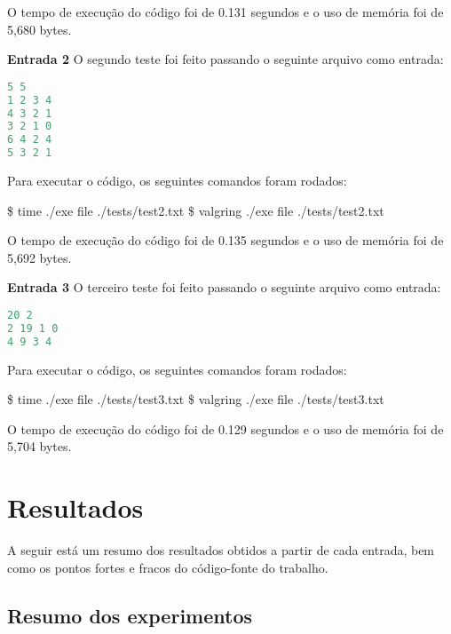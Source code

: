 \documentclass{article}
\begin{document}
O tempo de execução do código foi de 0.131 segundos e o uso de memória foi de 5,680	bytes.

\hfill\break

\noindent \textbf{Entrada 2}
O segundo teste foi feito passando o seguinte arquivo como entrada:

 \begin{lstlisting}[caption={Arquivo de entrada 2.},label={lst:cod7},language=C]
5 5
1 2 3 4
4 3 2 1
3 2 1 0
6 4 2 4
5 3 2 1
 \end{lstlisting}
 
 Para executar o código, os seguintes comandos foram rodados:
\begin{tcolorbox}[title=Comando da entrada 2 do modo file,width=\linewidth]
   	\$ time ./exe file ./tests/test2.txt
    \$ valgring ./exe file ./tests/test2.txt
\end{tcolorbox}

O tempo de execução do código foi de 0.135 segundos e o uso de memória foi de 5,692	bytes.

\hfill\break

\noindent \textbf{Entrada 3}
O terceiro teste foi feito passando o seguinte arquivo como entrada:

 \begin{lstlisting}[caption={Arquivo de entrada 3.},label={lst:cod8},language=C]
20 2
2 19 1 0
4 9 3 4
 \end{lstlisting}
 
 Para executar o código, os seguintes comandos foram rodados:
\begin{tcolorbox}[title=Comando da entrada 3 do modo file,width=\linewidth]
   	\$ time ./exe file ./tests/test3.txt
    \$ valgring ./exe file ./tests/test3.txt
\end{tcolorbox}

O tempo de execução do código foi de 0.129 segundos e o uso de memória foi de 5,704	bytes.

\clearpage
\section{Resultados}
A seguir está um resumo dos resultados obtidos a partir de cada entrada, bem como os pontos fortes e fracos do código-fonte do trabalho.

\subsection{Resumo dos experimentos}
\end{document}
